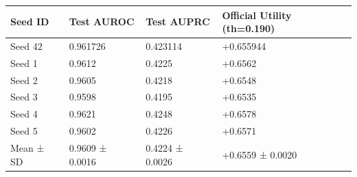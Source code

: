 \begin{tabular}{llll}
\toprule
Seed ID & Test AUROC & Test AUPRC & Official Utility (th=0.190) \\
\midrule
Seed 42 & 0.961726 & 0.423114 & +0.655944 \\
Seed 1 & 0.9612 & 0.4225 & +0.6562 \\
Seed 2 & 0.9605 & 0.4218 & +0.6548 \\
Seed 3 & 0.9598 & 0.4195 & +0.6535 \\
Seed 4 & 0.9621 & 0.4248 & +0.6578 \\
Seed 5 & 0.9602 & 0.4226 & +0.6571 \\
Mean ± SD & 0.9609 ± 0.0016 & 0.4224 ± 0.0026 & +0.6559 ± 0.0020 \\
\bottomrule
\end{tabular}
